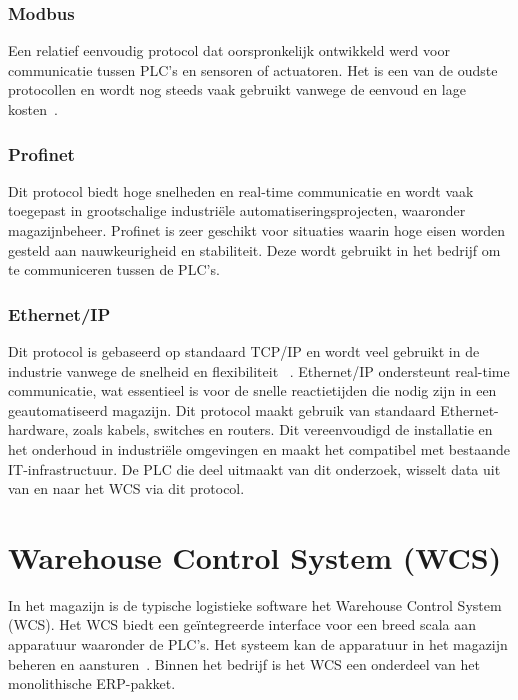 \subsubsection{Modbus}
Een relatief eenvoudig protocol dat oorspronkelijk ontwikkeld werd voor communicatie tussen PLC’s en sensoren of actuatoren. 
Het is een van de oudste protocollen en wordt nog steeds vaak gebruikt vanwege de eenvoud en lage kosten~\autocite{Joshi2024}. 

\subsubsection{Profinet}
Dit protocol biedt hoge snelheden en real-time communicatie 
en wordt vaak toegepast in grootschalige industriële automatiseringsprojecten, waaronder magazijnbeheer. 
Profinet is zeer geschikt voor situaties waarin hoge eisen worden gesteld aan nauwkeurigheid en stabiliteit.
Deze wordt gebruikt in het bedrijf om te communiceren tussen de PLC's.

\subsubsection{Ethernet/IP}
Dit protocol is gebaseerd op standaard TCP/IP en wordt veel gebruikt in de industrie vanwege de snelheid en flexibiliteit ~\autocite{Joshi2024}. 
Ethernet/IP ondersteunt real-time communicatie, wat essentieel is voor de snelle reactietijden die nodig zijn in een geautomatiseerd magazijn.
Dit protocol maakt gebruik van standaard Ethernet-hardware, zoals kabels, switches en routers. 
Dit vereenvoudigd de installatie en het onderhoud in industriële omgevingen en maakt het compatibel met bestaande IT-infrastructuur.
De PLC die deel uitmaakt van dit onderzoek, wisselt data uit van en naar het WCS via dit protocol.

\section{Warehouse Control System (WCS)} 
In het magazijn is de typische logistieke software het Warehouse Control System (WCS). 
Het WCS biedt een geïntegreerde interface voor een breed scala aan apparatuur waaronder de PLC's. 
Het systeem kan de apparatuur in het magazijn beheren en aansturen~\autocite{Son2015}. 
Binnen het bedrijf is het WCS een onderdeel van het monolithische ERP-pakket.

